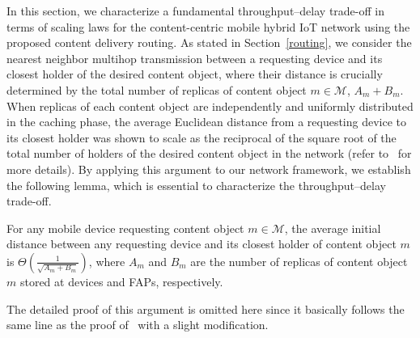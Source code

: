 \documentclass[10pt,journal,compsoc,onecolumn]{IEEEtran}
\begin{document}
In this section, we characterize a fundamental throughput--delay trade-off in terms of scaling laws for the content-centric mobile hybrid IoT network using the proposed content delivery routing. %
As stated in Section~\ref{routing}, we consider the nearest
neighbor multihop transmission between a requesting device and its
closest holder of the desired content object, where their distance
is crucially determined by the total number of replicas of content
object $m \in \mathcal{M}$, $A_m+B_m$. When replicas of each
content object are independently and uniformly distributed in the
caching phase, the average Euclidean distance from a requesting
device to its closest holder was shown to scale as the reciprocal of
the square root of the total number of holders of the desired
content object in the network (refer to~\cite{c1,a1} for more details). By applying this
argument to our network framework, we establish the
following lemma, which is essential to characterize the
throughput--delay trade-off.
\begin{lemma} \label{dist}
For any mobile device requesting content object $m \in \mathcal{M}$,
the average initial distance between any requesting device and its
closest holder of content object $m$ is
$\Theta\left(\frac{1}{\sqrt{A_m+B_m}}\right)$, where $A_m$ and
$B_m$ are the number of replicas of content object $m$ stored at
devices and FAPs, respectively.
\end{lemma}
\begin{IEEEproof}
The detailed proof of this argument is omitted here since it
basically follows the same line as the proof of~\cite[Lemma
3]{a1} with a slight modification.
\end{IEEEproof}
\end{document}

